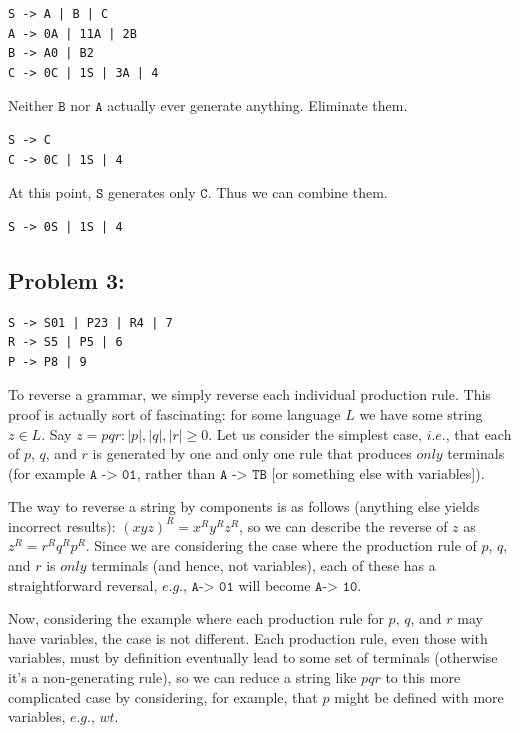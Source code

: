 \documentclass[a4paper]{article}
\begin{document}
\begin{verbatim}
S -> A | B | C
A -> 0A | 11A | 2B
B -> A0 | B2
C -> 0C | 1S | 3A | 4
\end{verbatim}

Neither $\texttt{B}$ nor $\texttt{A}$ actually ever generate anything. Eliminate them.

\begin{verbatim}
S -> C
C -> 0C | 1S | 4
\end{verbatim}

At this point, $\texttt{S}$ generates only $\texttt{C}$. Thus we can combine them.

\begin{verbatim}
S -> 0S | 1S | 4
\end{verbatim}

\subsection*{Problem 3:} 

\begin{verbatim}
S -> S01 | P23 | R4 | 7
R -> S5 | P5 | 6
P -> P8 | 9
\end{verbatim}

To reverse a grammar, we simply reverse each individual production rule. This proof is actually sort of fascinating: for some language $L$ we have some string $z \in L$. Say $z = pqr : |p|, |q|, |r| \geq 0$. Let us consider the simplest case, $\textit{i.e.}$, that each of $p$, $q$, and $r$ is generated by one and only one rule that produces $\textit{only}$ terminals (for example $\texttt{A -> 01}$, rather than $\texttt{A -> TB}$ [or something else with variables]).

The way to reverse a string by components is as follows (anything else yields incorrect results): $(xyz)^R = x^R y^R z^R$, so we can describe the reverse of $z$ as $z^R = r^R q^R p^R$. Since we are considering the case where the production rule of $p$, $q$, and $r$ is $\textit{only}$ terminals (and hence, not variables), each of these has a straightforward reversal, $\textit{e.g.}$, $\texttt{A-> 01}$ will become $\texttt{A-> 10}$.

Now, considering the example where each production rule for $p$, $q$, and $r$ may have variables, the case is not different. Each production rule, even those with variables, must by definition eventually lead to some set of terminals (otherwise it's a non-generating rule), so we can reduce a string like $pqr$ to this more complicated case by considering, for example, that $p$ might be defined with more variables, $\textit{e.g.}$, $wt$.
\end{document}

